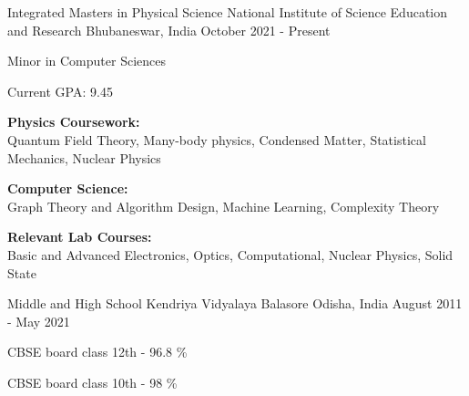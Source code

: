 

\begin{cventries}

  \cventry
    {Integrated Masters in Physical Science} %
    {National Institute of Science Education and Research} %
    {Bhubaneswar, India} %
    {October 2021 - Present} %
    {
      \begin{cvitems} %
        \item {Minor in Computer Sciences}
        \item {Current GPA: 9.45}
        \item{\textbf{Physics Coursework:} \\Quantum Field Theory, Many-body physics, Condensed Matter, Statistical Mechanics,  Nuclear Physics} 
        \item{\textbf{Computer Science:} \\Graph Theory and Algorithm Design, Machine Learning, Complexity Theory}
        \item{\textbf{Relevant Lab Courses:} \\Basic and Advanced Electronics, Optics, Computational, Nuclear Physics, Solid State}\\
      \end{cvitems}
    }
        
    
  \cventry
    {Middle and High School} %
    {Kendriya Vidyalaya Balasore} %
    {Odisha, India} %
    {August 2011 - May 2021} %
    {
      \begin{cvitems} %
        \item CBSE board class 12th - 96.8 \%
        \item CBSE board class 10th - 98 \%
      \end{cvitems}
    }
\end{cventries}
